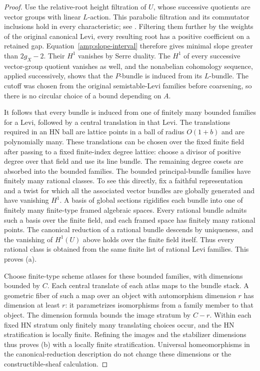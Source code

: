 \begin{proof}
Use the relative-root height filtration of $U$, whose successive
quotients are vector groups with linear $L$-action.  This parabolic
filtration and its commutator inclusions hold in every characteristic;
see \cite[Theorem~5.4.3]{ConradReductive}.  Filtering them further
by the weights of the original canonical Levi, every resulting root
has a positive coefficient on a retained gap.  Equation~\eqref{amp:slope-interval}
therefore gives minimal slope greater than $2g_X-2$.
Their $H^1$ vanishes by Serre duality.  The $H^1$ of every successive
vector-group quotient vanishes as well, and the nonabelian cohomology
sequence, applied successively, shows that the $P$-bundle is induced
from its $L$-bundle.  The cutoff was chosen from the original
semistable-Levi families before coarsening, so there is no circular
choice of a bound depending on $A$.

It follows that every bundle is induced from one of finitely many
bounded families for a Levi, followed by a central translation in
that Levi.  The translations required in an HN ball are lattice
points in a ball of radius $O(1+b)$ and are polynomially many.
These translations can be chosen over the fixed finite field after
passing to a fixed finite-index degree lattice: choose a divisor of
positive degree over that field and use its line bundle.  The
remaining degree cosets are absorbed into the bounded families.
The bounded principal-bundle families have finitely many rational
classes.  To see this directly, fix a faithful representation and
a twist for which all the associated vector bundles are globally
generated and have vanishing $H^1$.  A basis of global sections
rigidifies each bundle into one of finitely many finite-type framed
algebraic spaces.  Every rational bundle admits such a basis over
the finite field, and each framed space has finitely many rational
points.  The canonical
reduction of a rational bundle descends by uniqueness, and the
vanishing of $H^1(U)$ above holds over the finite field itself.
Thus every rational class is obtained from the same finite list of
rational Levi families.  This proves (a).

Choose finite-type scheme atlases for these bounded families, with
dimensions bounded by $C$.  Each central translate of each atlas
maps to the bundle stack.  A geometric fiber of such a map over an
object with automorphism dimension $r$ has dimension at least $r$:
it parametrizes isomorphisms from a family member to that object.
The dimension formula bounds the image stratum by $C-r$.
Within each fixed HN stratum only finitely many translating
choices occur, and the HN stratification is locally finite.
Refining the images and the stabilizer dimensions thus proves (b)
with a locally finite stratification.
Universal homeomorphisms in the canonical-reduction description do
not change these dimensions or the constructible-sheaf calculation.


\end{proof}
